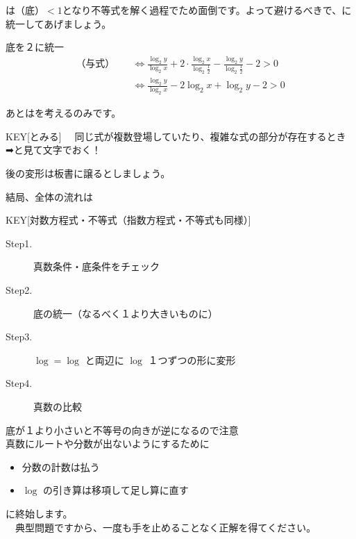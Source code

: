 \documentclass[luatex,fontsize=8pt,paper=b5,twoside,report]{jlreq}%
\begin{document}
\begin{multicols*}{2}
\tri {} は$（底）< 1$となり不等式を解く過程でため面倒です。よって避けるべきで、に統一してあげましょう。

\begin{ascolorbox10}{底を$２$に統一}
  \begin{align*}
  \text{（与式）} \quad 
  &\Leftrightarrow \frac{\log_2 y}{\log_2 x} 
  + 2 \cdot \frac{\log_2 x}{\log_2 \frac{1}{2}} 
  - \frac{\log_2 y}{\log_2 \frac{1}{2}} - 2 > 0 \\
  &\Leftrightarrow \frac{\log_2 y}{\log_2 x} 
  - 2 \log_2 x 
  + \log_2 y - 2 > 0
  \end{align*}
\end{ascolorbox10}

\tri あとはを考えるのみです。

\begin{ptbs}{KEY}[とみる]
  　同じ式が複数登場していたり、複雑な式の部分が存在するとき\\
  ➡︎と見て文字でおく！
\end{ptbs}

後の変形は板書に譲るとしましょう。

\tri 結局、全体の流れは

\begin{ptbs}{KEY}[対数方程式・不等式（指数方程式・不等式も同様）]
  \begin{description}
    \item[Step1.] 真数条件・底条件をチェック
    \item[Step2.] 底の統一（なるべく１より大きいものに）  
    \item[Step3.] $\log = \log$ と両辺に $\log$ １つずつの形に変形
    \item[Step4.] 真数の比較 
  \end{description}
   底が１より小さいと不等号の向きが逆になるので注意\\
   真数にルートや分数が出ないようにするために
  \begin{itemize}
    \item[\maru{1}] 分数の計数は払う
    \item[\maru{2}] $\log$ の引き算は移項して足し算に直す 
  \end{itemize}
\end{ptbs}
に終始します。\\
　典型問題ですから、一度も手を止めることなく正解を得てください。
\end{multicols*}

\vspace*{.5mm}\vspace*{.6mm}

\notefill

\begin{ascolorbox14}{}
  \vspace*{6em}
\end{ascolorbox14}
\end{document}
